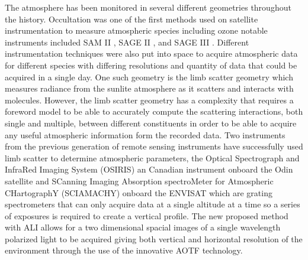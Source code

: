 \documentclass[12pt]{article}
\begin{document}
The atmosphere has been monitored in several different geometries throughout the history. Occultation was one of the first methods used on satellite instrumentation to measure atmospheric species including ozone notable instruments included SAM II \citep{McCormick1979}, SAGE II \citep{McCormick1987}, and SAGE III \citep{Thomason2003}. Different instrumentation techniques were also put into space to acquire atmospheric data for different species with differing resolutions and quantity of data that could be acquired in a single day. One such geometry is the limb scatter geometry which measures radiance from the sunlite atmosphere as it scatters and interacts with molecules. However, the limb scatter geometry has a complexity that requires a foreword model to be able to accurately compute the scattering interactions, both single and multiple, between different constituents in order to be able to acquire any useful atmospheric information form the recorded data. Two instruments from the previous generation of remote sensing instruments have successfully used limb scatter to determine atmospheric parameters, the Optical Spectrograph and InfraRed Imaging System (OSIRIS) an Canadian instrument onboard the Odin satellite \citep{Llewellyn2004} and SCanning Imaging Absorption spectroMeter for Atmospheric CHartographY (SCIAMACHY) onboard the ENVISAT \citep{Bovensmann1999} which are grating spectrometers that can only acquire data at a single altitude at a time so a series of exposures is required to create a vertical profile. The new proposed method with ALI allows for a two dimensional spacial images of a single wavelength polarized light to be acquired giving both vertical and horizontal resolution of the environment through the use of the innovative AOTF technology.
\end{document}
